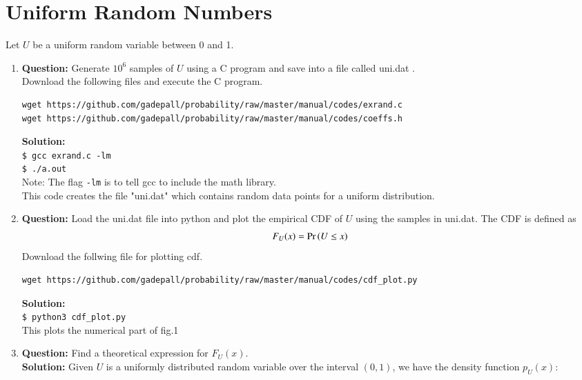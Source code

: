 \documentclass[journal,12pt,twocolumn]{IEEEtran}
\begin{document}
\date{}


\maketitle
\section{Uniform Random Numbers}
Let $U$ be a uniform random variable between 0 and 1.
\begin{enumerate}[label=\thesection.\arabic*,ref=\thesection.\theenumi]
    \item\textbf{Question:} Generate $10^6$ samples of $U$ using a C program and save into a file called uni.dat .\\
Download the following files and execute the  C program.
        \begin{lstlisting}
wget https://github.com/gadepall/probability/raw/master/manual/codes/exrand.c
wget https://github.com/gadepall/probability/raw/master/manual/codes/coeffs.h
\end{lstlisting}
\textbf{Solution:}\\
\texttt{\$ gcc exrand.c -lm}\\
\texttt{\$ ./a.out}\\
Note: The flag \texttt{-lm} is to tell gcc to include the math library.\\ 
This code creates the file "uni.dat" which contains random data points for a uniform distribution.





\item\textbf{Question:} Load the uni.dat file into python and plot the empirical CDF of $U$ using the samples in uni.dat. The CDF is defined as
\begin{align}
F_{U}(x) = \Pr\left(U \le x\right)
\end{align}
Download the follwing file for plotting cdf.
\begin{lstlisting}
wget https://github.com/gadepall/probability/raw/master/manual/codes/cdf_plot.py
\end{lstlisting}
\textbf{Solution:}\\
\texttt{\$ python3 cdf\_plot.py}\\
This plots the numerical part of fig.1



\item\textbf{Question:} Find a  theoretical expression for $F_{U}(x)$.\\
\textbf{Solution:} Given $U$ is a uniformly distributed random variable over the interval $(0, 1)$, we have the density function $p_U(x)$:


\end{enumerate}
\end{document}

